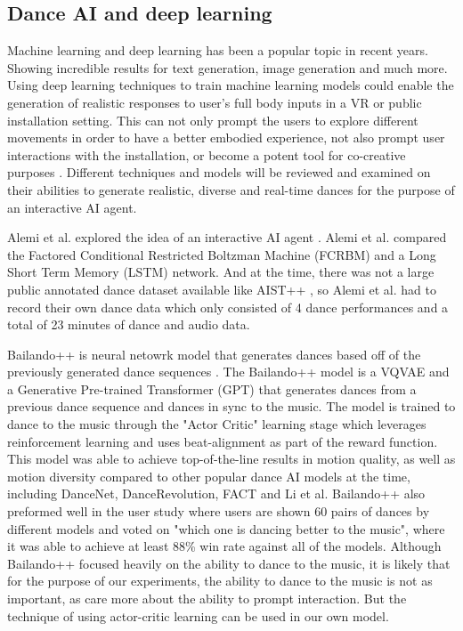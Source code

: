 \documentclass[final,5p,times,twocolumn,authoryear]{article}
\begin{document}
\subsection{Dance AI and deep learning}

Machine learning and deep learning has been a popular topic in recent
years. Showing incredible results for text generation, image generation
and much more. Using deep learning techniques to train machine learning
models could enable the generation of realistic responses to user's full
body inputs in a VR or public installation setting.  This can not only
prompt the users to explore different movements in order to have a
better embodied experience, not also prompt user interactions with the
installation, or become a potent tool for co-creative purposes
\cite{Wallace2023}.  Different techniques and models will be reviewed
and examined on their abilities to generate realistic, diverse and
real-time dances for the purpose of an interactive AI agent.

Alemi et al. explored the idea of an interactive AI agent
\cite{Alemi2017}. Alemi et al. compared the Factored Conditional
Restricted Boltzman Machine (FCRBM) and a Long Short Term Memory (LSTM)
network. And at the time, there was not a large public annotated dance
dataset available like AIST++ \cite{Li2021}, so Alemi et al. had to
record their own dance data which only consisted of 4 dance performances
and a total of 23 minutes of dance and audio data.

Bailando++ is neural netowrk model that generates dances based off of
the previously generated dance sequences \cite{Siyao2023}. The
Bailando++ model is a VQVAE and a Generative Pre-trained Transformer
(GPT) that generates dances from a previous dance sequence and dances in sync
to the music. The model is trained to dance to the music through
the "Actor Critic" learning stage which leverages
reinforcement learning and uses beat-alignment as part of the reward function. This
model was able to achieve top-of-the-line results in motion quality, as
well as motion diversity compared to other
popular dance AI models at the time, including DanceNet,
DanceRevolution, FACT and Li et al. Bailando++ also preformed well in
the user study where users are shown 60 pairs of dances by different
models and voted on "which one is dancing better to the music", where it
was able to achieve at least 88\% win rate against all of the models.
Although Bailando++ focused heavily on the ability to dance to the
music, it is likely that for the purpose of our experiments, the ability
to dance to the music is not as important, as care more about the
ability to prompt interaction. But the technique of using actor-critic
learning can be used in our own model.
\end{document}
